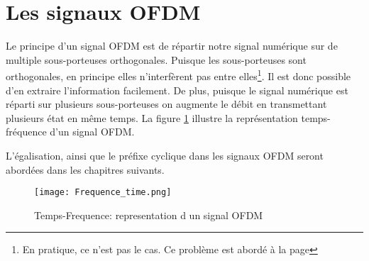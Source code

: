 
\section*{Les signaux OFDM}
\label{sec:defofdm}

Le principe d'un signal OFDM est de répartir notre signal numérique sur de
multiple sous-porteuses orthogonales. Puisque les sous-porteuses sont
orthogonales, en principe elles n'interfèrent pas entre elles\footnote{En pratique, ce n'est
  pas le cas. Ce problème est abordé à la page \pageref{sec:ICI}}. Il est donc
possible d'en extraire l'information facilement. De plus,
puisque le signal numérique est réparti sur plusieurs sous-porteuses on augmente
le débit en transmettant plusieurs état en même temps. La figure
\ref{fig:tempsFreq} illustre la représentation temps-fréquence d'un signal OFDM.

L'égalisation, ainsi que le préfixe cyclique dans les signaux OFDM seront
abordées dans les chapitres suivants.

\begin{figure}[!h]
  \centering
  \texttt{[image: Frequence\_time.png]}
  \caption[Temps-Frequence]{Temps-Frequence: representation d un signal OFDM\cite{keysight:_concep_ofdm}}
  \label{fig:tempsFreq}
\end{figure}


